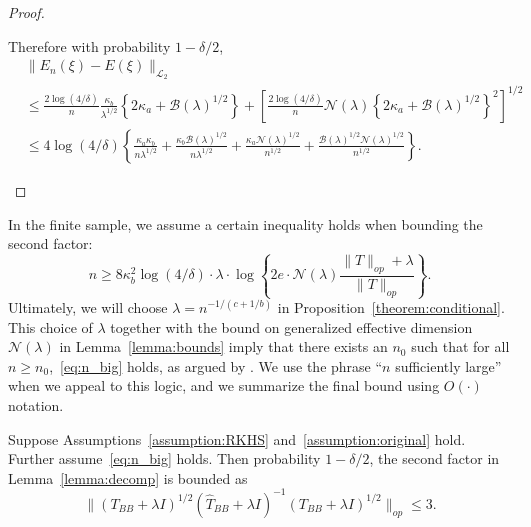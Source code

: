 \begin{proof}
\begin{enumerate}
    Therefore with probability $1-\delta/2$,
    \begin{align*}
        &\|E_n(\xi)-E(\xi)\|_{\mathcal{L}_2}  \\
        &\leq \frac{2 \log(4/\delta)}{n} \frac{\kappa_b}{\lambda^{1/2}} \left\{2\kappa_a+\mathcal{B}(\lambda)^{1/2}\right\} + \left[\frac{2 \log(4/\delta)}{n} \mathcal{N}(\lambda)\left\{2\kappa_a+\mathcal{B}(\lambda)^{1/2}\right\}^2\right]^{1/2} \\
        &\leq 4\log(4/\delta) \left\{\frac{\kappa_a\kappa_b}{n\lambda^{1/2}}+\frac{\kappa_b\mathcal{B}(\lambda)^{1/2}}{n\lambda^{1/2}}+\frac{\kappa_a \mathcal{N}(\lambda)^{1/2}}{n^{1/2}}+\frac{\mathcal{B}(\lambda)^{1/2}\mathcal{N}(\lambda)^{1/2}}{n^{1/2}}\right\}.
     \end{align*}
    
    
\end{enumerate}

\end{proof}

\begin{remark}\label{remark:big_n}
In the finite sample, we assume a certain inequality holds when bounding the second factor: 
\begin{equation}\label{eq:n_big}
  n\geq 8\kappa_b^2 \log(4/\delta) \cdot \lambda \cdot 
\log
\left\{ 2e\cdot \mathcal{N}(\lambda)\frac{\|T\|_{op}+\lambda}{\|T\|_{op}}
\right\}.  
\end{equation}
Ultimately, we will choose $\lambda=n^{-1/(c+1/b)}$ in Proposition~\ref{theorem:conditional}. This choice of $\lambda$ together with the bound on generalized effective dimension $\mathcal{N}(\lambda)$ in Lemma~\ref{lemma:bounds} imply that there exists an $n_0$ such that for all $n\geq n_0$,~\eqref{eq:n_big} holds, as argued by \cite[Proof of Theorem 1]{fischer2017sobolev}. We use the phrase ``$n$ sufficiently large'' when we appeal to this logic, and we summarize the final bound using $O(\cdot)$ notation.
\end{remark}

\begin{lemma}\label{lemma:2}
Suppose Assumptions~\ref{assumption:RKHS} and~\ref{assumption:original} hold. Further assume~\eqref{eq:n_big} holds. Then probability $1-\delta/2$, the second factor in Lemma~\ref{lemma:decomp} is bounded as 
$$
\|(T_{BB}+\lambda I)^{1/2}(\hat{T}_{BB}+\lambda I)^{-1}(T_{BB}+\lambda I)^{1/2}\|_{op} \leq 3.
$$
\end{lemma}


